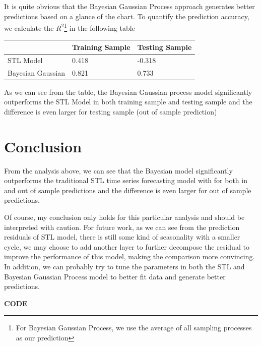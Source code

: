 \documentclass[letterpaper,12pt]{article}
\begin{document}
It is quite obvious that the Bayesian Gaussian Process approach generates better predictions based on a glance of the chart. To quantify the prediction accuracy, we calculate the $R^2$\footnote{For Bayesian Gaussian Process, we use the average of all sampling processes as our prediction} in the following table

\begin{table}[h]
	\centering
	\begin{tabular}{lll}
		\hline \hline
		& Training Sample     & Testing Sample    \\ \hline
		
		STL Model  & 0.418  & -0.318       \\  
		Bayesian Gaussian & 0.821 & 0.733 \\ \hline \hline
	\end{tabular}
\end{table}

As we can see from the table, the Bayesian Gaussian process model significantly outperforms the STL Model in both training sample and testing sample and the difference is even larger for testing sample (out of sample prediction)

\section{Conclusion}
From the analysis above, we can see that the Bayesian model significantly outperforms the traditional STL time series forecasting model with for both in and out of sample predictions and the difference is even larger for out of sample predictions. 

Of course, my conclusion only holds for this particular analysis and should be interpreted with caution. For future work, as we can see from the prediction residuals of STL model, there is still some kind of seasonality with a smaller cycle, we may choose to add another layer to further decompose the residual to improve the performance of this model, making the comparison more convincing. In addition, we can probably try to tune the parameters in both the STL and Bayesian Gaussian Process model to better fit data and generate better predictions. 


\clearpage
\setlength\bibsep{0pt}



\newpage
\textbf{CODE}

\end{document}
